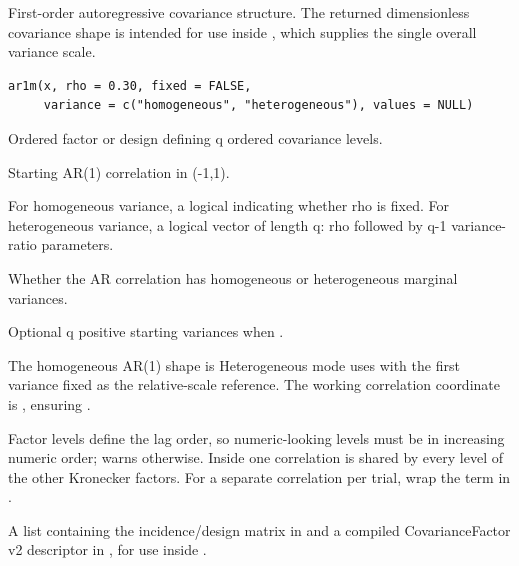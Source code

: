 \documentclass[a4paper]{book}
\begin{document}
%
\begin{Description}\relax
First-order autoregressive covariance structure. The returned dimensionless covariance shape is intended for use inside , which supplies the single overall variance scale.
\end{Description}
%
\begin{Usage}
\begin{verbatim}
ar1m(x, rho = 0.30, fixed = FALSE,
     variance = c("homogeneous", "heterogeneous"), values = NULL)
\end{verbatim}
\end{Usage}
%
\begin{Arguments}
\begin{ldescription}
\item[\code{x}] Ordered factor or design defining q ordered covariance levels.
\item[\code{rho}] Starting AR(1) correlation in (-1,1).
\item[\code{fixed}] For homogeneous variance, a logical indicating whether rho is fixed. For heterogeneous variance, a logical vector of length q: rho followed by q-1 variance-ratio parameters.
\item[\code{variance}] Whether the AR correlation has homogeneous or heterogeneous marginal variances.
\item[\code{values}] Optional q positive starting variances when .
\end{ldescription}
\end{Arguments}
%
\begin{Details}\relax
The homogeneous AR(1) shape is  Heterogeneous mode uses  with the first variance fixed as the relative-scale reference. The working correlation coordinate is , ensuring .

Factor levels define the lag order, so numeric-looking levels must be in increasing numeric order;  warns otherwise. Inside  one correlation is shared by every level of the other Kronecker factors. For a separate correlation per trial, wrap the  term in .
\end{Details}
%
\begin{Value}
A list containing the incidence/design matrix in  and a compiled CovarianceFactor v2 descriptor in , for use inside .
\end{Value}
\end{document}
